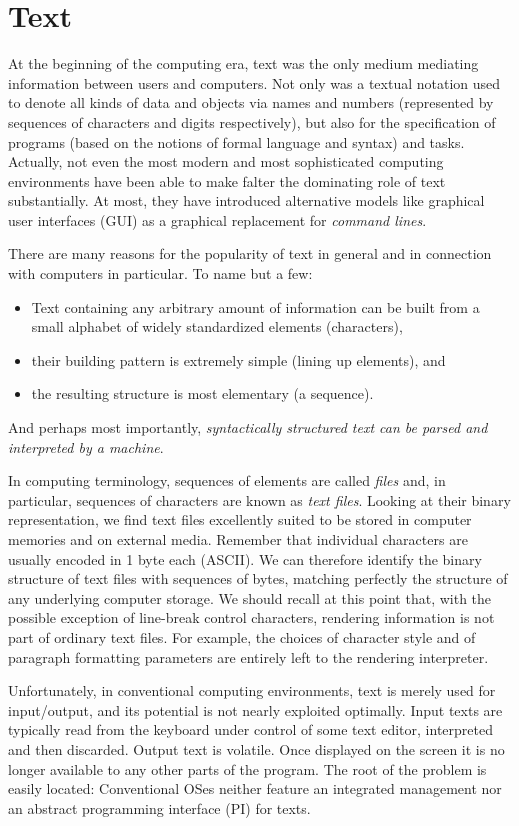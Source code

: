 \chapter{Text}
\label{ch:text}
At the beginning of the computing era, text was the only medium mediating information
between users and computers.  Not only was a textual notation used to denote
all kinds of data and objects via names and numbers
(represented by sequences of characters and digits respectively),
but also for the specification of programs
(based on the notions of formal language and syntax) and tasks.
Actually, not even the most modern and most sophisticated computing environments
have been able to make falter the dominating role of text substantially.
At most, they have introduced alternative models like graphical user interfaces (GUI)
as a graphical replacement for \emph{command lines}.

There are many reasons for the popularity of text in general
and in connection with computers in particular.  To name but a few:
\begin{itemize}
  \item Text containing any arbitrary amount of information can be built
    from a small alphabet of widely standardized elements (characters),
  \item their building pattern is extremely simple (lining up elements), and
  \item the resulting structure is most elementary (a sequence).
\end{itemize}
And perhaps most importantly, \emph{syntactically structured text
can be parsed and interpreted by a machine}.

In computing terminology, sequences of elements are called \emph{files} and,
in particular, sequences of characters are known as \emph{text files}.
Looking at their binary representation, we find text files excellently suited
to be stored in computer memories and on external media.
Remember that individual characters are usually encoded in 1 byte each (ASCII).
We can therefore identify the binary structure of text files with sequences of bytes,
matching perfectly the structure of any underlying computer storage.
We should recall at this point that, with the possible exception of line-break control characters,
rendering information is not part of ordinary text files.
For example, the choices of character style and of paragraph formatting parameters
are entirely left to the rendering interpreter.

Unfortunately, in conventional computing environments, text is merely used for input/output,
and its potential is not nearly exploited optimally.
Input texts are typically read from the keyboard under control of some text editor,
interpreted and then discarded.  Output text is volatile.
Once displayed on the screen it is no longer available to any other parts of the program.
The root of the problem is easily located:
Conventional OSes neither feature an integrated management
nor an abstract programming interface (PI) for texts.

